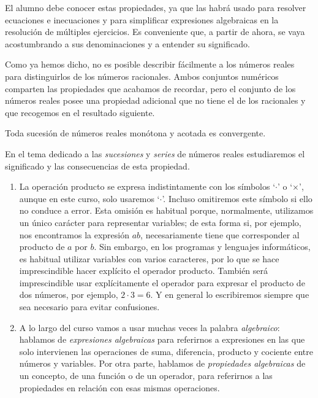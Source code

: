 El alumno debe conocer estas propiedades, ya que las habrá usado para resolver ecuaciones e inecuaciones y para simplificar expresiones algebraicas en la resolución de múltiples ejercicios.
Es conveniente que, a partir de ahora, se vaya acostumbrando a sus denominaciones y a entender su significado.

Como ya hemos dicho, no es posible describir fácilmente a los números reales para distinguirlos de los números racionales.
Ambos conjuntos numéricos comparten las propiedades que acabamos de recordar, pero el conjunto de los números reales posee una propiedad adicional que no tiene el de los racionales y que recogemos en el resultado siguiente.

\begin{teorema}\label{th:completitud}
Toda sucesión de números reales monótona y acotada es convergente.
\end{teorema}

En el tema dedicado a las \emph{sucesiones} y \emph{series} de números reales estudiaremos el significado y las consecuencias de esta propiedad.

\begin{nota-br}
\begin{enumerate}
\item
La operación producto se expresa indistintamente con los símbolos `$\cdot$' o `$\times$', aunque en este curso, solo usaremos `$\cdot$'.
Incluso omitiremos este símbolo si ello no conduce a error.
Esta omisión es habitual porque, normalmente, utilizamos un único carácter para representar variables; de esta forma si, por ejemplo, nos encontramos la expresión $ab$, necesariamente tiene que corresponder al producto de $a$ por $b$.
Sin embargo, en los programas y lenguajes informáticos, es habitual utilizar variables con varios caracteres, por lo que se hace imprescindible hacer explícito el operador producto.
También será imprescindible usar explícitamente el operador para expresar el producto de dos números, por ejemplo,
 $2\cdot 3=6$.
Y en general lo escribiremos siempre que sea necesario para evitar confusiones.

\item
A lo largo del curso vamos a usar muchas veces la palabra \emph{algebraico}:
hablamos de \emph{expresiones algebraicas} para referirnos a expresiones en las que solo intervienen las operaciones de suma, diferencia, producto y cociente entre números y variables.
Por otra parte, hablamos de \emph{propiedades algebraicas} de un concepto, de una función o de un operador, para referirnos a las propiedades en relación con esas mismas operaciones.
\end{enumerate}
\end{nota-br}

